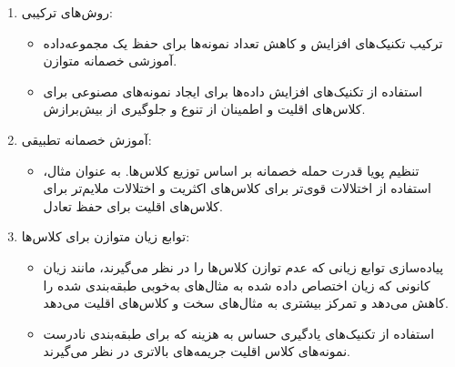 \begin{qsolve}
\begin{enumerate}
\begin{enumerate}
		
		\item روش‌های ترکیبی:
		\begin{itemize}
			\item 
ترکیب تکنیک‌های افزایش و کاهش تعداد نمونه‌ها برای حفظ یک مجموعه‌داده آموزشی خصمانه متوازن.


			\item 
استفاده از تکنیک‌های افزایش داده‌ها برای ایجاد نمونه‌های مصنوعی برای کلاس‌های اقلیت و اطمینان از تنوع و جلوگیری از بیش‌برازش.
		\end{itemize}
		
		
		
		\item آموزش خصمانه تطبیقی:
		\begin{itemize}
			\item 
تنظیم پویا قدرت حمله خصمانه بر اساس توزیع کلاس‌ها. به عنوان مثال، استفاده از اختلالات قوی‌تر برای کلاس‌های اکثریت و اختلالات ملایم‌تر برای کلاس‌های اقلیت برای حفظ تعادل.
		\end{itemize}
		
		
		
		
		\item توابع زیان متوازن برای کلاس‌ها:
		\begin{itemize}
			\item 
پیاده‌سازی توابع زیانی که عدم توازن کلاس‌ها را در نظر می‌گیرند، مانند زیان کانونی که زیان اختصاص داده شده به مثال‌های به‌خوبی طبقه‌بندی شده را کاهش می‌دهد و تمرکز بیشتری به مثال‌های سخت و کلاس‌های اقلیت می‌دهد.


			\item 
استفاده از تکنیک‌های یادگیری حساس به هزینه که برای طبقه‌بندی نادرست نمونه‌های کلاس اقلیت جریمه‌های بالاتری در نظر می‌گیرند.
		\end{itemize}
	\end{enumerate}
\end{enumerate}
	
\end{qsolve}





